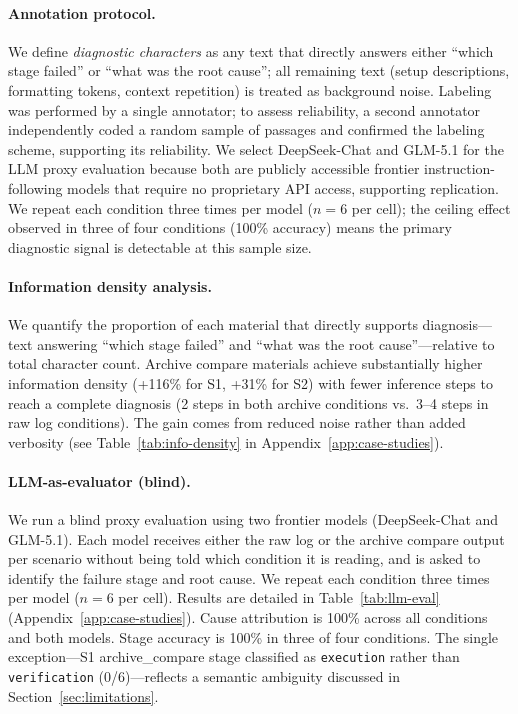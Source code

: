 \documentclass[11pt]{article}
\begin{document}
\paragraph{Annotation protocol.}
We define \emph{diagnostic characters} as any text that directly answers either ``which stage failed'' or ``what was the root cause''; all remaining text (setup descriptions, formatting tokens, context repetition) is treated as background noise. Labeling was performed by a single annotator; to assess reliability, a second annotator independently coded a random sample of passages and confirmed the labeling scheme, supporting its reliability. We select DeepSeek-Chat and GLM-5.1 for the LLM proxy evaluation because both are publicly accessible frontier instruction-following models that require no proprietary API access, supporting replication. We repeat each condition three times per model ($n{=}6$ per cell); the ceiling effect observed in three of four conditions (100\% accuracy) means the primary diagnostic signal is detectable at this sample size.

\paragraph{Information density analysis.}
We quantify the proportion of each material that directly supports diagnosis---text answering ``which stage failed'' and ``what was the root cause''---relative to total character count. Archive compare materials achieve substantially higher information density (+116\% for S1, +31\% for S2) with fewer inference steps to reach a complete diagnosis (2 steps in both archive conditions vs.\ 3--4 steps in raw log conditions). The gain comes from reduced noise rather than added verbosity (see Table~\ref{tab:info-density} in Appendix~\ref{app:case-studies}).

\paragraph{LLM-as-evaluator (blind).}
We run a blind proxy evaluation using two frontier models (DeepSeek-Chat and GLM-5.1). Each model receives either the raw log or the archive compare output per scenario without being told which condition it is reading, and is asked to identify the failure stage and root cause. We repeat each condition three times per model ($n{=}6$ per cell). Results are detailed in Table~\ref{tab:llm-eval} (Appendix~\ref{app:case-studies}). Cause attribution is 100\% across all conditions and both models. Stage accuracy is 100\% in three of four conditions. The single exception---S1 archive\_compare stage classified as \texttt{execution} rather than \texttt{verification} (0/6)---reflects a semantic ambiguity discussed in Section~\ref{sec:limitations}.
\end{document}
